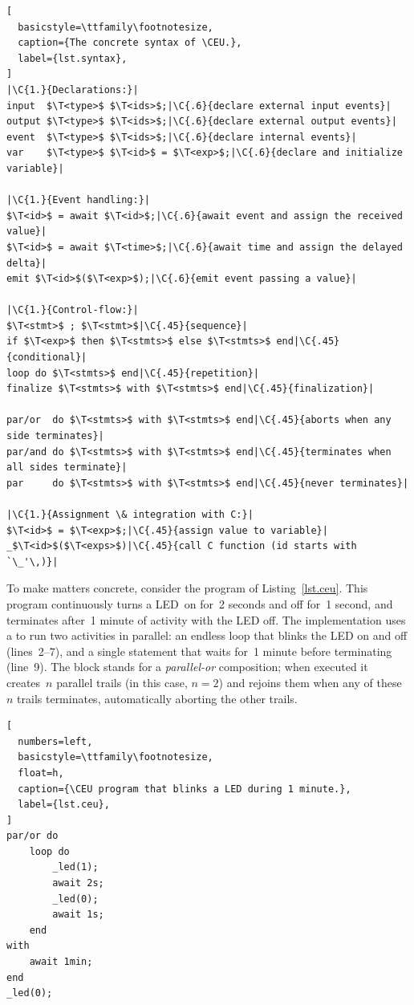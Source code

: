 \bgroup
\def\T<#1>{\langle\mathit{#1}\rangle}
\def\C#1#2{\hfill\rmfamily\itshape\makebox[#1\columnwidth][l]{//~#2}}
\begin{lstlisting}[
  basicstyle=\ttfamily\footnotesize,
  caption={The concrete syntax of \CEU.},
  label={lst.syntax},
]
|\C{1.}{Declarations:}|
input  $\T<type>$ $\T<ids>$;|\C{.6}{declare external input events}|
output $\T<type>$ $\T<ids>$;|\C{.6}{declare external output events}|
event  $\T<type>$ $\T<ids>$;|\C{.6}{declare internal events}|
var    $\T<type>$ $\T<id>$ = $\T<exp>$;|\C{.6}{declare and initialize variable}|

|\C{1.}{Event handling:}|
$\T<id>$ = await $\T<id>$;|\C{.6}{await event and assign the received value}|
$\T<id>$ = await $\T<time>$;|\C{.6}{await time and assign the delayed delta}|
emit $\T<id>$($\T<exp>$);|\C{.6}{emit event passing a value}|

|\C{1.}{Control-flow:}|
$\T<stmt>$ ; $\T<stmt>$|\C{.45}{sequence}|
if $\T<exp>$ then $\T<stmts>$ else $\T<stmts>$ end|\C{.45}{conditional}|
loop do $\T<stmts>$ end|\C{.45}{repetition}|
finalize $\T<stmts>$ with $\T<stmts>$ end|\C{.45}{finalization}|

par/or  do $\T<stmts>$ with $\T<stmts>$ end|\C{.45}{aborts when any side terminates}|
par/and do $\T<stmts>$ with $\T<stmts>$ end|\C{.45}{terminates when all sides terminate}|
par     do $\T<stmts>$ with $\T<stmts>$ end|\C{.45}{never terminates}|

|\C{1.}{Assignment \& integration with C:}|
$\T<id>$ = $\T<exp>$;|\C{.45}{assign value to variable}|
_$\T<id>$($\T<exps>$)|\C{.45}{call C function (id starts with `\_'\,)}|
\end{lstlisting}
\egroup

To make matters concrete, consider the program of Listing~\ref{lst.ceu}.
%
This program continuously turns a LED~on for~2 seconds and off for~1 second,
and terminates after~1 minute of activity with the LED off.
%
The implementation uses a  to run two activities in parallel:
an endless loop that blinks the LED on and off (lines~2--7), and a single
statement that waits for~1 minute before terminating (line~9).
%
The  block stands for a \emph{parallel-or} composition; when
executed it creates~$n$ parallel trails (in this case, $n=2$) and rejoins
them when any of these~$n$ trails terminates, automatically aborting the
other trails.

\begin{lstlisting}[
  numbers=left,
  basicstyle=\ttfamily\footnotesize,
  float=h,
  caption={\CEU program that blinks a LED during 1 minute.},
  label={lst.ceu},
]
par/or do
    loop do
        _led(1);
        await 2s;
        _led(0);
        await 1s;
    end
with
    await 1min;
end
_led(0);
\end{lstlisting}

